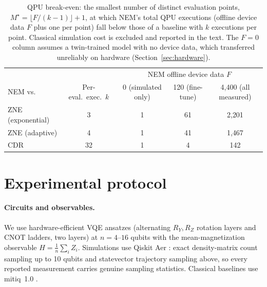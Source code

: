 \documentclass[11pt]{article}
\begin{document}
\begin{table}[t]
\caption{QPU break-even: the smallest number of distinct evaluation points, $M^\star=\lfloor F/(k-1)\rfloor+1$, at which NEM's total QPU executions (offline device data $F$ plus one per point) fall below those of a baseline with $k$ executions per point. Classical simulation cost is excluded and reported in the text. The $F{=}0$ column assumes a twin-trained model with no device data, which transferred unreliably on hardware (Section~\ref{sec:hardware}).}
\label{tab:breakeven}
\centering
\small
\begin{tabular}{lcccc}
\toprule
& & \multicolumn{3}{c}{NEM offline device data $F$} \\
NEM vs.\ & Per-eval.\ exec.\ $k$ & 0 (simulated only) & 120 (fine-tune) & 4{,}400 (all measured) \\
\midrule
ZNE (exponential) & 3 & 1 & 61 & 2{,}201 \\
ZNE (adaptive) & 4 & 1 & 41 & 1{,}467 \\
CDR & 32 & 1 & 4 & 142 \\
\bottomrule
\end{tabular}
\end{table}

\section{Experimental protocol}
\label{sec:setup}

\paragraph{Circuits and observables.}
We use hardware-efficient VQE ansatzes (alternating $R_Y,R_Z$ rotation layers and CNOT ladders, two layers) at $n=4$--$16$ qubits with the mean-magnetization observable $H=\frac{1}{n}\sum_i Z_i$. Simulations use Qiskit Aer \citep{qiskit2024}: exact density-matrix count sampling up to 10 qubits and statevector trajectory sampling above, so every reported measurement carries genuine sampling statistics. Classical baselines use mitiq~1.0 \citep{larose2022mitiq}.
\end{document}
